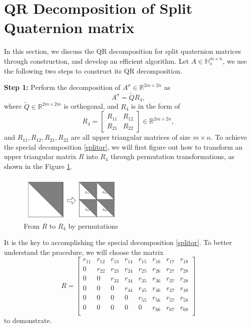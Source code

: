 \documentclass[3p]{elsarticle}
\numberwithin{equation}{section}
\begin{document}
\section{QR Decomposition of Split Quaternion matrix}
In this section, we discuss the QR decomposition for split quaternion matrices through construction, and develop an efficient algorithm. Let $A \in \mathbb{H}_s^{m \times n}$, we use the following two steps to construct its QR decomposition.  

\textbf{Step 1:} Perform the decomposition of $A^\sigma \in \mathbb{R}^{2m \times 2n}$ as 
\begin{equation}\label{splitqr}
A^\sigma = \widetilde{Q} R_4,
\end{equation} 
where $\widetilde{Q} \in \mathbb{R}^{2m\times 2m}$ is orthogonal, and $R_4  $ is in the form of 
\begin{equation}\label{r4}
R_4 = \begin{bmatrix}
    R_{11} & R_{12} \\
    R_{21} & R_{22}
\end{bmatrix} \in \mathbb{R}^{2m \times 2n},
\end{equation}
and $R_{11}, R_{12},R_{21},R_{22}$ are all upper triangular matrices of size $m \times n$. To achieve the special decomposition \eqref{splitqr},  we will first figure out how to transform an upper triangular matrix $R$ into $R_4$ through permutation transformations, as shown in the Figure \ref{fig:Upper triangular}.
\begin{figure}[htbp]
        \centering
        \includegraphics[width=0.45\textwidth,keepaspectratio=true]{Upper triangular.png} %
    \caption{From $R$ to $R_4$ by permutations }
     \label{fig:Upper triangular}
\end{figure}
It is the key to accomplishing the special decomposition \eqref{splitqr}.
To better understand the procedure, we will choose the matrix 
\[R= \begin{bmatrix}
 r_{11} & r_{12} & r_{13} & r_{14} & r_{15} & r_{16} & r_{17} & r_{18}\\
 0      & r_{22} & r_{23} & r_{24} & r_{25} & r_{26} & r_{27} & r_{28}\\
 0      & 0      & r_{33} & r_{34} & r_{35} & r_{36} & r_{37} & r_{38}\\
 0      & 0      & 0      & r_{44} & r_{45} & r_{46} & r_{47} & r_{48}\\
 0      & 0      & 0      & 0      & r_{55} & r_{56} & r_{57} & r_{58}\\
 0      & 0      & 0      & 0      & 0      & r_{66} & r_{67} & r_{68}\\
\end{bmatrix}
\]
to demonstrate. 
\end{document}
